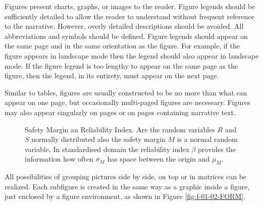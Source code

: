 Figures present charts, graphs, or images to the reader. Figure legends should be sufficiently detailed to allow the reader to understand without frequent reference to the narrative. However, overly detailed descriptions should be avoided. All abbreviations and symbols should be defined. Figure legends should appear on the same page and in the same orientation as the figure. For example, if the figure appears in landscape mode then the legend should also appear in landscape mode. If the figure legend is too lengthy to appear on the same page as the figure, then the legend, in its entirety, must appear on the next page.

Similar to tables, figures are usually constructed to be no more than what can appear on one page, but occasionally multi-paged figures are necessary. Figures may also appear singularly on pages or on pages containing narrative text.


\begin{figure}[h!]
  \centering
  
  \caption[Safety Margin an Reliability Index]{Safety Margin an Reliability Index. Are the random variables $R$ and $S$ normally distributed also the safety margin $M$ is a normal random variable. In standardised domain the reliability index $\beta$ provides the information how often $\sigma_{{M}}$ has space between the origin and $\mu_{{M}}$.}
  \label{fig:f-01-01-a-SafetyMargin}
\end{figure}

All possibilities of grouping pictures side by side, on top or in matrices can be realized. Each subfigure is created in the same way  as a graphic inside a figure, just enclosed by a figure environment, as shown in Figure \ref{fig:f-01-02-FORM}.


